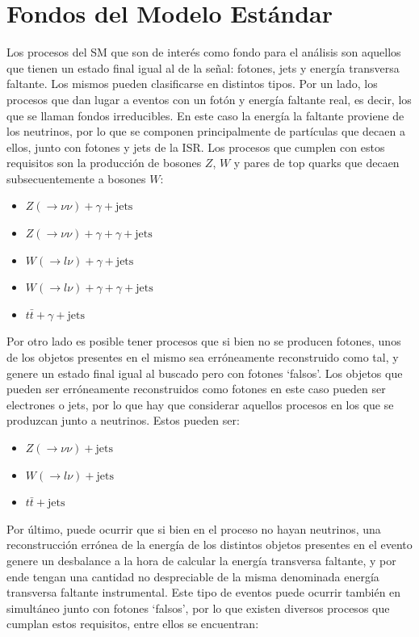\section{Fondos del Modelo Estándar}

Los procesos del SM que son de interés como fondo para el análisis son aquellos que tienen un estado final igual al de la señal: fotones, jets y energía transversa faltante. Los mismos pueden clasificarse en distintos tipos. Por un lado, los procesos que dan lugar a eventos con un fotón y energía faltante real, es decir, los que se llaman fondos irreducibles. En este caso la energía la faltante proviene de los neutrinos, por lo que se componen principalmente de partículas que decaen a ellos, junto con fotones y jets de la ISR. Los procesos que cumplen con estos requisitos son la producción de bosones $Z$, $W$ y pares de top quarks que decaen subsecuentemente a bosones $W$:

\begin{itemize}
	\item $Z(\rightarrow \nu\nu) + \gamma + \text{jets}$
  \item $Z(\rightarrow \nu\nu) + \gamma + \gamma + \text{jets}$
	\item $W(\rightarrow l\nu) + \gamma + \text{jets}$
  \item $W(\rightarrow l\nu) + \gamma + \gamma + \text{jets}$
	\item $t\bar{t} + \gamma + \text{jets}$
\end{itemize}

Por otro lado es posible tener procesos que si bien no se producen fotones, unos de los objetos presentes en el mismo sea erróneamente reconstruido como tal, y genere un estado final igual al buscado pero con fotones `falsos'. Los objetos que pueden ser erróneamente reconstruidos como fotones en este caso pueden ser electrones o jets, por lo que hay que considerar aquellos procesos en los que se produzcan junto a neutrinos. Estos pueden ser:

\begin{itemize}
  \item $Z(\rightarrow \nu\nu) + \text{jets}$
  \item $W(\rightarrow l\nu) + \text{jets}$
  \item $t\bar{t} + \text{jets}$
\end{itemize}

Por último, puede ocurrir que si bien en el proceso no hayan neutrinos, una reconstrucción errónea de la energía de los distintos objetos presentes en el evento genere un desbalance a la hora de calcular la energía transversa faltante, y por ende tengan una cantidad no despreciable de la misma denominada energía transversa faltante instrumental. Este tipo de eventos puede ocurrir también en simultáneo junto con fotones `falsos', por lo que existen diversos procesos que cumplan estos requisitos, entre ellos se encuentran:

